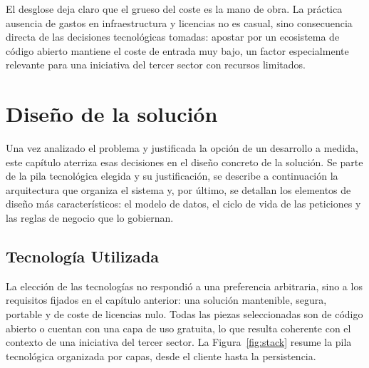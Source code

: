 \documentclass[11pt,oneside,spanish,listoffigures,listoftables]{tfgetsinf}
\begin{document}
El desglose deja claro que el grueso del coste es la mano de obra. La práctica ausencia de gastos en infraestructura y licencias no es casual, sino consecuencia directa de las decisiones tecnológicas tomadas: apostar por un ecosistema de código abierto mantiene el coste de entrada muy bajo, un factor especialmente relevante para una iniciativa del tercer sector con recursos limitados.

\chapter{Diseño de la solución}

Una vez analizado el problema y justificada la opción de un desarrollo a medida, este capítulo aterriza esas decisiones en el diseño concreto de la solución. Se parte de la pila tecnológica elegida y su justificación, se describe a continuación la arquitectura que organiza el sistema y, por último, se detallan los elementos de diseño más característicos: el modelo de datos, el ciclo de vida de las peticiones y las reglas de negocio que lo gobiernan.

\section{Tecnología Utilizada}

La elección de las tecnologías no respondió a una preferencia arbitraria, sino a los requisitos fijados en el capítulo anterior: una solución mantenible, segura, portable y de coste de licencias nulo. Todas las piezas seleccionadas son de código abierto o cuentan con una capa de uso gratuita, lo que resulta coherente con el contexto de una iniciativa del tercer sector. La Figura~\ref{fig:stack} resume la pila tecnológica organizada por capas, desde el cliente hasta la persistencia.
\end{document}
